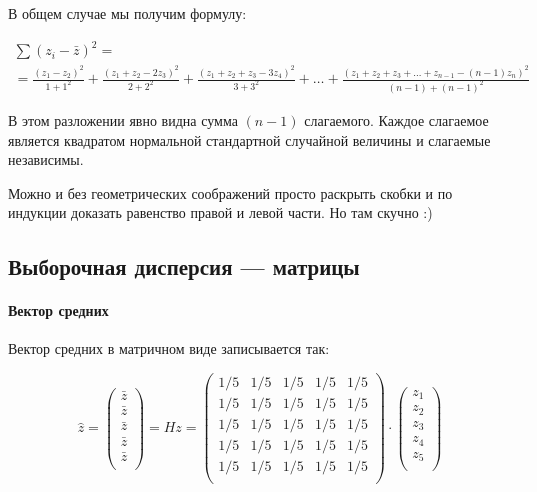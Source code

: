 \documentclass[11pt,russian,]{article}
\let\oldparagraph\paragraph
\renewcommand{\paragraph}[1]{\oldparagraph{#1}\mbox{}}
\newcommand{\1}{\mathbbm{1}}
\begin{document}
В общем случае мы получим формулу:

\begin{multline}
\nonumber
\sum (z_i - \bar z)^2 = \\
= \frac{(z_1 - z_2)^2}{1+1^2} + \frac{(z_1 + z_2 - 2z_3)^2}{2+2^2} + \frac{(z_1 + z_2 + z_3 - 3z_4)^2}{3+3^2} + \ldots + \frac{(z_1 + z_2 + z_3 + \ldots + z_{n-1} - (n-1)z_n)^2}{(n-1)+(n-1)^2}
\end{multline}

В этом разложении явно видна сумма \((n-1)\) слагаемого. Каждое
слагаемое является квадратом нормальной стандартной случайной величины и
слагаемые независимы.

Можно и без геометрических соображений просто раскрыть скобки и по
индукции доказать равенство правой и левой части. Но там скучно :)

\subsection{Выборочная дисперсия --- матрицы}\label{--}

\paragraph{Вектор средних}\label{-}

Вектор средних в матричном виде записывается так:

\[
\hat z =
\begin{pmatrix}
\bar z \\
\bar z \\
\bar z \\
\bar z \\
\bar z \\
\end{pmatrix} =
Hz=
\begin{pmatrix}
1/5 & 1/5 & 1/5 & 1/5 & 1/5 \\
1/5 & 1/5 & 1/5 & 1/5 & 1/5 \\
1/5 & 1/5 & 1/5 & 1/5 & 1/5 \\
1/5 & 1/5 & 1/5 & 1/5 & 1/5 \\
1/5 & 1/5 & 1/5 & 1/5 & 1/5 \\
\end{pmatrix} \cdot
\begin{pmatrix}
z_1 \\
z_2 \\
z_3 \\
z_4 \\
z_5 \\
\end{pmatrix}
\]
\end{document}
